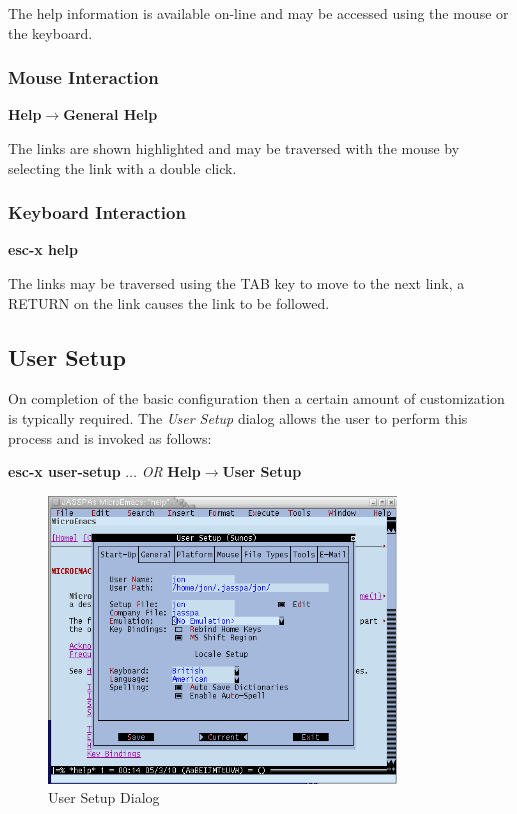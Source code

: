 \documentclass[11pt,a4paper,pdftex]{article}
\begin{document}
  The help information is available on-line and may be accessed using the
  mouse or the keyboard.

\subsubsection{Mouse Interaction}

  \textbf{Help$\rightarrow$General Help}

  The links are shown highlighted and may be traversed with the mouse by
  selecting the link with a double click.

\subsubsection{Keyboard Interaction}

  \textbf{esc-x help}

  The links may be traversed using the TAB key to move to the next link, a
  RETURN on the link causes the link to be followed.

\subsection{User Setup}

  On completion of the basic configuration then a certain amount of
  customization is typically required. The \textit{User Setup} dialog allows
  the user to perform this process and is invoked as follows:

  \textbf{esc-x user-setup} $\dots$ \textit{OR}\newline
  \textbf{Help$\rightarrow$User Setup}

\begin{figure}[!hbt]
  \begin{center}
    \includegraphics[keepaspectratio,height=3in]{usersetup}
    \caption{User Setup Dialog}
    \label{fig:usersetup}
  \end{center}
\end{figure}
\end{document}
